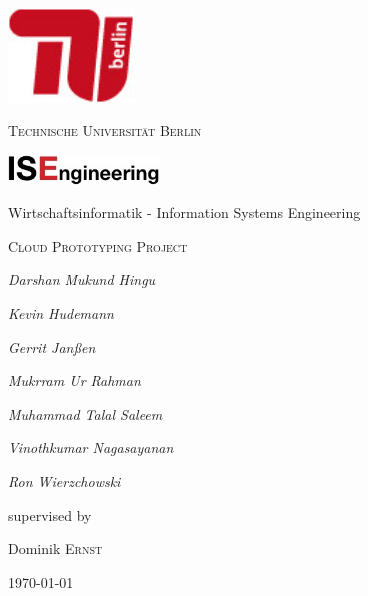 \begin{titlepage}
	\centering
	\includegraphics[width=0.25\textwidth]{figures/tu_logo}\par\vspace{1cm}
	{\scshape\LARGE Technische Universität Berlin \par}
	\vspace{0.75cm}
	\includegraphics[width=0.3\textwidth]{figures/ise_logo}\par
    \vspace{0.25cm}
	{\normalsize Wirtschaftsinformatik - Information Systems Engineering \par}
    \vspace{0.5cm}
	{\scshape\Large Cloud Prototyping Project\par}
	\vspace{0.75cm}
	{\Large\itshape Darshan Mukund Hingu\par}
	{\Large\itshape Kevin Hudemann\par}
	{\Large\itshape Gerrit Janßen\par}
	{\Large\itshape Mukrram Ur Rahman\par}
	{\Large\itshape Muhammad Talal Saleem\par}
	{\Large\itshape Vinothkumar Nagasayanan\par}
	{\Large\itshape Ron Wierzchowski\par}
	\vfill
	supervised by\par
	Dominik \textsc{Ernst}\par
	\vfill
	{\large \today\par}
\end{titlepage}
